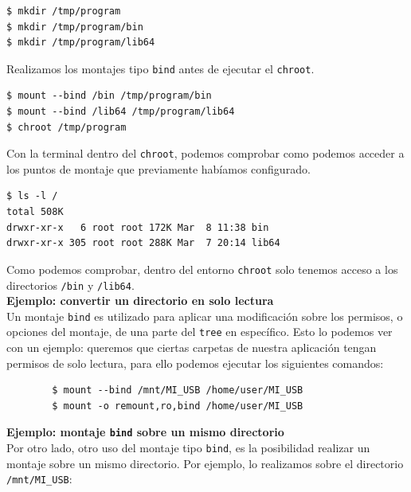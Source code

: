 \documentclass[a4paper, oneside, 12pt]{book}
\begin{document}
	\begin{verbatim}
$ mkdir /tmp/program
$ mkdir /tmp/program/bin
$ mkdir /tmp/program/lib64
	\end{verbatim}

	\noindent Realizamos los montajes tipo \texttt{bind} antes de ejecutar el \texttt{chroot}.
	
	\begin{verbatim}
$ mount --bind /bin /tmp/program/bin
$ mount --bind /lib64 /tmp/program/lib64
$ chroot /tmp/program
	\end{verbatim}

	\noindent Con la terminal dentro del \texttt{chroot}, podemos comprobar como podemos acceder a los puntos de montaje que previamente habíamos configurado.
	
	\begin{verbatim}
$ ls -l / 
total 508K
drwxr-xr-x   6 root root 172K Mar  8 11:38 bin
drwxr-xr-x 305 root root 288K Mar  7 20:14 lib64
	\end{verbatim}

	\noindent Como podemos comprobar, dentro del entorno \texttt{chroot} solo tenemos acceso a los directorios \texttt{/bin} y \texttt{/lib64}. \\
	
	
	\noindent \textbf{\large Ejemplo: convertir un directorio en solo lectura}\\
	
	\noindent Un montaje \texttt{bind} es utilizado para aplicar una modificación sobre los permisos, o opciones del montaje, de una parte del \texttt{tree} en específico. Esto lo podemos ver con un ejemplo: queremos que ciertas carpetas de nuestra aplicación tengan permisos de solo lectura, para ello podemos ejecutar los siguientes comandos:
	
	\begin{verbatim}
		$ mount --bind /mnt/MI_USB /home/user/MI_USB
		$ mount -o remount,ro,bind /home/user/MI_USB
	\end{verbatim} 

	\vspace{10px}
	
	\noindent \textbf{\large Ejemplo: montaje \texttt{bind} sobre un mismo directorio}\\
	
	\noindent Por otro lado, otro uso del montaje tipo \texttt{bind}, es la posibilidad realizar un montaje sobre un mismo directorio. Por ejemplo, lo realizamos sobre el directorio \texttt{/mnt/MI\_USB}:
	
\end{document}
